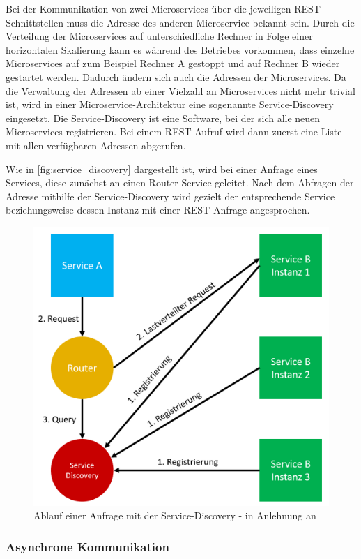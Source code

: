 \label{service_discovery}Bei der Kommunikation von zwei Microservices über die jeweiligen REST-Schnittstellen muss die Adresse des anderen Microservice bekannt sein. Durch die Verteilung der Microservices auf unterschiedliche Rechner in Folge einer horizontalen Skalierung kann es während des Betriebes vorkommen, dass einzelne Microservices auf zum Beispiel Rechner A gestoppt und auf Rechner B wieder gestartet werden. Dadurch ändern sich auch die Adressen der Microservices. Da die Verwaltung der Adressen ab einer Vielzahl an Microservices nicht mehr trivial ist, wird in einer Microservice-Architektur eine sogenannte Service-Discovery eingesetzt. Die Service-Discovery ist eine Software, bei der sich alle neuen Microservices registrieren. Bei einem REST-Aufruf wird dann zuerst eine Liste mit allen verfügbaren Adressen abgerufen.

Wie in \autoref{fig:service_discovery} dargestellt ist, wird bei einer Anfrage eines Services, diese zunächst an einen Router-Service geleitet. Nach dem Abfragen der Adresse mithilfe der Service-Discovery wird gezielt der entsprechende Service beziehungsweise dessen Instanz mit einer REST-Anfrage angesprochen.

\begin{figure}[H]
    \centering
    \includegraphics[width=0.65\linewidth]{images/service-discovery.png}
    \caption{Ablauf einer Anfrage mit der Service-Discovery - in Anlehnung an \cite{MichaelSchwab.2019}}
    \label{fig:service_discovery}
\end{figure}

\subsubsection*{Asynchrone Kommunikation}

